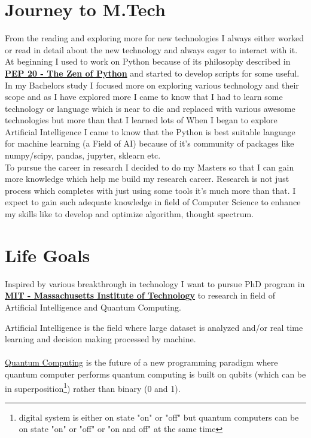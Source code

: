 \documentclass[a4paper, 14pt]{article}
\begin{document}
	\newpage
	\section*{Journey to M.Tech}
	From the reading and exploring more for new technologies I always either worked or read in detail about the new technology and always eager to interact with it. \\

	At beginning I used to work on Python because of its philosophy described in \href{https://www.python.org/dev/peps/pep-0020/#the-zen-of-python}{\textbf{PEP 20 -  The Zen of Python}} and started to develop scripts for some useful. \\
	In my Bachelors study I focused more on exploring various technology and their scope and as I have explored more I came to know that I had to learn some technology or language which is near to die and replaced with various awesome technologies but more than that I learned lots of 
	When I began to explore Artificial Intelligence I came to know that the Python is best suitable language for machine learning (a Field of AI) because of it's community of packages like numpy/scipy, pandas, jupyter, sklearn etc. \\
	
	To pursue the career in research I decided to do my Masters so that I can gain more knowledge which help me build my research career. Research is not just  process which completes with just using some tools it's much more than that. I expect to gain such adequate knowledge in field of Computer Science to enhance my skills like to develop and optimize algorithm, thought spectrum.

	\section*{Life Goals}
	Inspired by various breakthrough in technology I want to pursue PhD program in \href{http://www.mit.edu/about/}{\textbf{MIT - Massachusetts Institute of Technology}} to research in field of Artificial Intelligence and Quantum Computing.
	
	Artificial Intelligence is the field where large dataset is analyzed and/or real time learning and decision making processed by machine. \\
	\\
	\href{https://en.wikipedia.org/wiki/Quantum_computing}{Quantum Computing} is the future of a new programming paradigm where quantum computer performs quantum computing is built on qubits (which can be in superposition\footnote{digital system is either on state "on" or "off" but quantum computers can be on state "on" or "off" or "on and off" at the same time}) rather than binary (0 and 1). 
\end{document}
